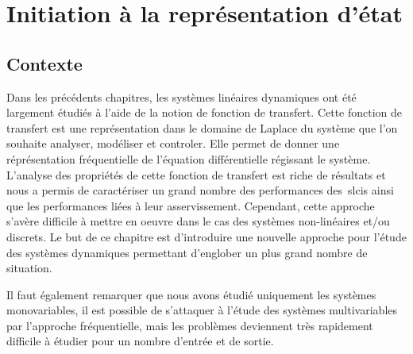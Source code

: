 \chapter[Représentation d'état]
{Initiation à la représentation d'état\label{chap-repreEtat}}
\minitoc
\newpage
\section{Contexte}
Dans les précédents chapitres, les systèmes linéaires dynamiques ont été 
largement étudiés à l'aide de la notion de fonction de transfert. Cette fonction
de transfert est une représentation dans le domaine de Laplace du système que
l'on souhaite analyser, modéliser et controler. Elle permet de donner
une réprésentation fréquentielle de l'équation différentielle régissant le 
système. L'analyse des propriétés de cette fonction de transfert est riche de
résultats et nous a permis de caractériser un grand nombre des performances
des~\glspl{slci} ainsi que les performances liées à leur asservissement. 
Cependant, cette approche s'avère difficile à mettre en oeuvre dans le cas 
des systèmes non-linéaires et/ou discrets. Le but de ce chapitre est 
d'introduire une nouvelle approche  pour l'étude des systèmes dynamiques 
permettant d'englober un plus grand nombre de situation. 

Il faut également remarquer que nous avons étudié uniquement les systèmes
monovariables, il est possible de s'attaquer à l'étude des systèmes 
multivariables par l'approche fréquentielle, mais les problèmes deviennent
très rapidement difficile à étudier pour un nombre d'entrée et de sortie.   
